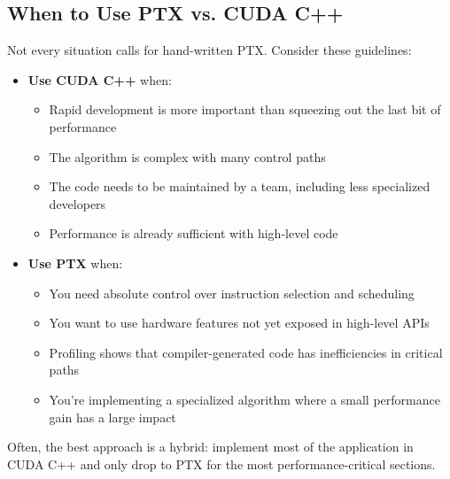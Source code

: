 \subsection{When to Use PTX vs. CUDA C++}

Not every situation calls for hand-written PTX. Consider these guidelines:

\begin{itemize}
    \item \textbf{Use CUDA C++} when:
    \begin{itemize}
        \item Rapid development is more important than squeezing out the last bit of performance
        \item The algorithm is complex with many control paths
        \item The code needs to be maintained by a team, including less specialized developers
        \item Performance is already sufficient with high-level code
    \end{itemize}
    
    \item \textbf{Use PTX} when:
    \begin{itemize}
        \item You need absolute control over instruction selection and scheduling
        \item You want to use hardware features not yet exposed in high-level APIs
        \item Profiling shows that compiler-generated code has inefficiencies in critical paths
        \item You're implementing a specialized algorithm where a small performance gain has a large impact
    \end{itemize}
\end{itemize}

Often, the best approach is a hybrid: implement most of the application in CUDA C++ and only drop to PTX for the most performance-critical sections.


